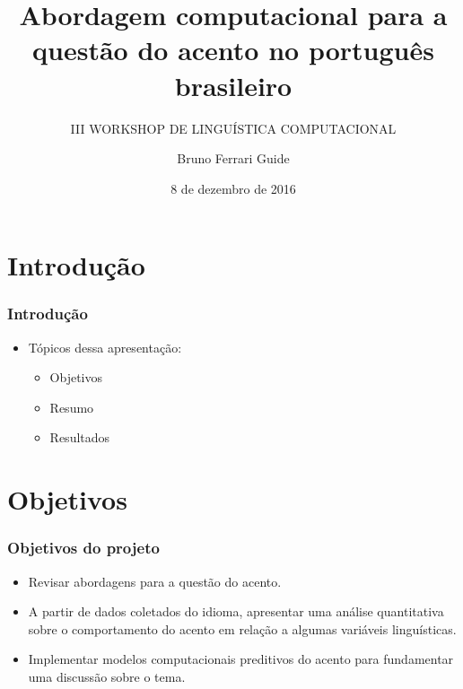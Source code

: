 \documentclass[xcolor=table]{beamer}
\author{Bruno Ferrari Guide}
\title{Abordagem computacional para a questão do acento no português brasileiro}
\subtitle{III WORKSHOP DE LINGUÍSTICA COMPUTACIONAL}
\institute{Orientador: Marcelo Barra Ferreira\\ Departamento de Linguística - FFLCH - USP}
\date{8 de dezembro de 2016}
\begin{document}
	\maketitle
	\section{Introdução}
	\begin{frame}
		\frametitle{Introdução}
		\begin{itemize}
			\item Tópicos dessa apresentação:\\
			\begin{itemize}
				\item Objetivos\\
				\item Resumo\\
				\item Resultados\\
			\end{itemize}
		\end{itemize}
	\end{frame}


	\section{Objetivos}
	\begin{frame}
		\frametitle{Objetivos do projeto}
		\begin{itemize}
			\item Revisar abordagens para a questão do acento.\\
			\item A partir de dados coletados do idioma, apresentar uma análise quantitativa sobre o comportamento do acento em relação a algumas variáveis linguísticas.\\
			\item Implementar modelos computacionais preditivos do acento para fundamentar uma discussão sobre o tema.\\
		\end{itemize}
	\end{frame}


\end{document}
